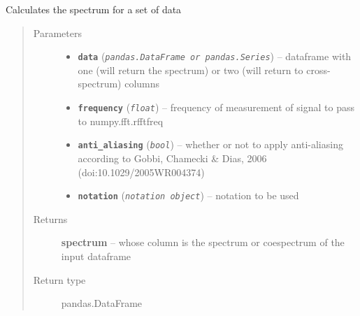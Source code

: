 \documentclass[a4paper,10pt,oneside]{sphinxmanual}
\begin{document}
\begin{fulllineitems}
\label{pymicra:pymicra.data.crossSpectra}
Calculates the spectrum for a set of data
\begin{quote}\begin{description}
\item[{Parameters}] \leavevmode\begin{itemize}
\item {} 
\textbf{\texttt{data}} (\emph{\texttt{pandas.DataFrame or pandas.Series}}) -- dataframe with one (will return the spectrum) or two (will return to cross-spectrum) columns

\item {} 
\textbf{\texttt{frequency}} (\emph{\texttt{float}}) -- frequency of measurement of signal to pass to numpy.fft.rfftfreq

\item {} 
\textbf{\texttt{anti\_aliasing}} (\emph{\texttt{bool}}) -- whether or not to apply anti-aliasing according to Gobbi, Chamecki \& Dias, 2006 (doi:10.1029/2005WR004374)

\item {} 
\textbf{\texttt{notation}} (\emph{\texttt{notation object}}) -- notation to be used

\end{itemize}

\item[{Returns}] \leavevmode
\textbf{spectrum} -- whose column is the spectrum or coespectrum of the input dataframe

\item[{Return type}] \leavevmode
pandas.DataFrame

\end{description}\end{quote}

\end{fulllineitems}

\end{document}
